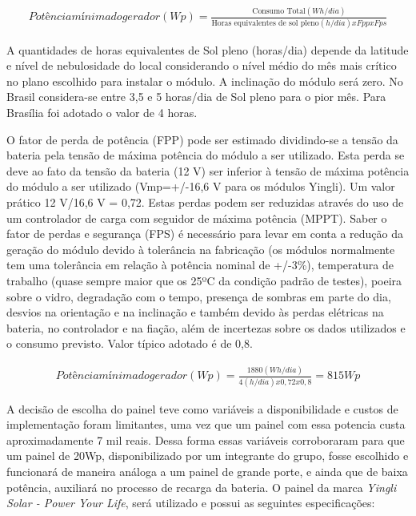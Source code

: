 \begin{eqnarray}
Potência mínima do gerador (Wp) = \frac{\text{Consumo Total}(Wh/dia) }{\text{Horas equivalentes de sol pleno} (h/dia) x Fpp x Fps}
\end{eqnarray}

        A quantidades de horas equivalentes de Sol pleno (horas/dia) depende da latitude e nível de nebulosidade do local considerando o nível médio do mês mais crítico no plano escolhido para instalar o módulo. A inclinação do módulo será zero. No Brasil considera-se entre 3,5 e 5 horas/dia de Sol pleno para o pior mês. Para Brasília foi adotado o valor de 4 horas.

        O fator de perda de potência (FPP) pode ser estimado dividindo-se a tensão da bateria pela tensão de máxima potência do módulo a ser utilizado. Esta perda se deve ao fato da tensão da bateria (12 V) ser inferior à tensão de máxima potência do módulo a ser utilizado (Vmp=+/-16,6 V para os módulos Yingli). Um valor prático 12 V/16,6 V = 0,72. Estas perdas podem ser reduzidas através do uso de um controlador de carga com seguidor de máxima potência (MPPT).
        Saber o fator de perdas e segurança (FPS) é necessário para levar em conta a redução da geração do módulo devido à tolerância na fabricação (os módulos normalmente tem uma tolerância em relação à potência nominal de +/-3\%), temperatura de trabalho (quase sempre maior que os 25ºC da condição padrão de testes), poeira sobre o vidro, degradação com o tempo, presença de sombras em parte do dia, desvios na orientação e na inclinação e também devido às perdas elétricas na bateria, no controlador e na fiação, além de incertezas sobre os dados utilizados e o consumo previsto. Valor típico adotado é de 0,8.

\begin{eqnarray}
Potência mínima do gerador (Wp) = \frac{\text{1880}(Wh/dia) }{\text{4} (h/dia) x 0,72 x 0,8} = 815 Wp
\end{eqnarray}

        A decisão de escolha do painel teve como variáveis a disponibilidade e custos de implementação foram limitantes, uma vez que um painel com essa potencia custa aproximadamente 7 mil reais. Dessa forma essas variáveis corroboraram para que um painel de 20Wp, disponibilizado por um integrante do grupo, fosse escolhido e funcionará de maneira análoga a um painel de grande porte, e ainda que de baixa potência,  auxiliará no processo de recarga da bateria.
        O painel da marca \textit{Yingli Solar - Power Your Life},  será utilizado e possui as seguintes especificações:


